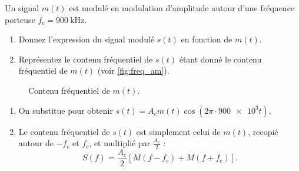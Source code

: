 \documentclass [a4paper, 11pt] {article}
\begin{document}
    \begin{exercice}[Modulation AM]{1}
        Un signal $m(t)$ est modulé en modulation d'amplitude autour d'une fréquence porteuse $f_c=\SI{900}{\kilo\hertz}$.
        
        \begin{enumerate}
            \item Donnez l'expression du signal modulé $s(t)$ en fonction de $m(t)$.
            \item Représentez le contenu fréquentiel de $s(t)$ étant donné le contenu fréquentiel de $m(t)$ (voir \autoref{fig:freq_am}).
        \end{enumerate}
        
        \begin{figure}[H]
            \centering
            \caption{Contenu fréquentiel de $m(t)$.}
            \label{fig:freq_am}
        \end{figure}
        
    \end{exercice}
    
    \begin{reponse}
        
        \begin{enumerate}
            \item On substitue pour obtenir $s(t) = A_c m(t) \cos(2\pi \cdot \num{900e3} t)$.
            \item Le contenu fréquentiel de $s(t)$ est simplement celui de $m(t)$, recopié autour de $-f_c$ et $f_c$, et multiplié par $\frac{A_c}{2}$ :
            \begin{equation}
                S(f) = \frac{A_c}{2} \left[M(f-f_c) + M(f+f_c) \right].
            \end{equation}
        \end{enumerate}
        
    \end{reponse}
    
\end{document}

